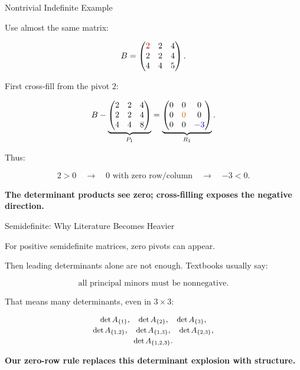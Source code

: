 \documentclass[10pt]{beamer}
\theoremstyle{definition}
\newcommand{\x}[1]{\alert{\textbf{#1}}}
\newcommand{\rd}[1]{{\color{red!70!black}#1}}
\newcommand{\bl}[1]{{\color{blue!70!black}#1}}
\newcommand{\ora}[1]{{\color{orange!80!black}#1}}
\begin{document}
\begin{frame}[shrink=5]{Nontrivial Indefinite Example}

Use almost the same matrix:

\[
B=
\begin{pmatrix}
\rd{2}&2&4\\
2&2&4\\
4&4&5
\end{pmatrix}.
\]

\vfill

First cross-fill from the pivot $2$:

\[
B-
\underbrace{
\begin{pmatrix}
2&2&4\\
2&2&4\\
4&4&8
\end{pmatrix}}_{P_1}
=
\underbrace{
\begin{pmatrix}
0&0&0\\
0&\ora{0}&0\\
0&0&\bl{-3}
\end{pmatrix}}_{R_1}.
\]

\vfill

Thus:

$$
\boxed{2>0}\quad\longrightarrow\quad
\boxed{0\text{ with zero row/column}}\quad\longrightarrow\quad
\boxed{-3<0}.
$$

\begin{center}
\x{The determinant products see zero; cross-filling exposes the negative direction.}
\end{center}

\end{frame}


\begin{frame}{Semidefinite: Why Literature Becomes Heavier}

For positive semidefinite matrices, zero pivots can appear.

\vfill

Then leading determinants alone are not enough.  Textbooks usually say:

$$
\boxed{\text{all principal minors must be nonnegative}.}
$$

\vfill

That means many determinants, even in $3\times3$:

\[
\small
\begin{array}{c}
\det A_{\{1\}},\quad \det A_{\{2\}},\quad \det A_{\{3\}},\\[0.2em]
\det A_{\{1,2\}},\quad \det A_{\{1,3\}},\quad \det A_{\{2,3\}},\\[0.2em]
\det A_{\{1,2,3\}}.
\end{array}
\]

\vfill

\begin{center}
\x{Our zero-row rule replaces this determinant explosion with structure.}
\end{center}

\end{frame}
\end{document}
